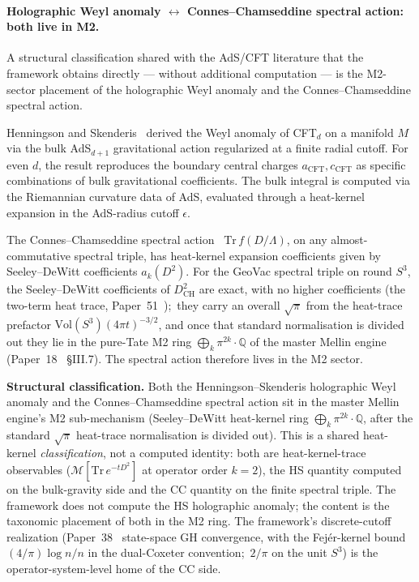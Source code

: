 \documentclass[11pt,a4paper]{article}
\theoremstyle{plain}
\theoremstyle{definition}
\newcommand{\sthree}{S^{3}}
\newcommand{\Q}{\mathbb{Q}}
\newcommand{\DCH}{D_{\mathrm{CH}}}
\begin{document}
\paragraph{Holographic Weyl anomaly $\leftrightarrow$ Connes--Chamseddine spectral action: both live in M2.}
A structural classification shared with the AdS/CFT literature that the framework
obtains directly --- without additional computation --- is the M2-sector
placement of the holographic Weyl anomaly and the
Connes--Chamseddine spectral action.

Henningson and Skenderis~\cite{henningson_skenderis1998} derived the Weyl
anomaly of CFT$_{d}$ on a manifold $M$ via the bulk AdS$_{d+1}$
gravitational action regularized at a finite radial cutoff. For even
$d$, the result reproduces the boundary central charges
$a_{\text{CFT}}, c_{\text{CFT}}$ as specific combinations of bulk
gravitational coefficients. The bulk integral is computed via the
Riemannian curvature data of AdS, evaluated through a heat-kernel
expansion in the AdS-radius cutoff $\epsilon$.

The Connes--Chamseddine spectral action~\cite{chamseddine_connes1997}
$\mathrm{Tr}\,f(D/\Lambda)$, on any almost-commutative spectral triple,
has heat-kernel expansion coefficients given by Seeley--DeWitt
coefficients $a_{k}(D^{2})$. For the GeoVac spectral triple on round
$\sthree$, the Seeley--DeWitt coefficients of $\DCH^{2}$ are exact,
with no higher coefficients (the two-term heat trace,
Paper~51~\cite{paper51});\ they carry an
overall $\sqrt{\pi}$ from the heat-trace prefactor
$\mathrm{Vol}(\sthree)(4\pi t)^{-3/2}$, and once that standard
normalisation is divided out they lie in the pure-Tate M2 ring
$\bigoplus_{k}\pi^{2k}\cdot\Q$ of the master Mellin engine
(Paper~18~\cite{paper18} \S III.7). The spectral action
therefore lives in the M2 sector.

\textbf{Structural classification.} Both the Henningson--Skenderis
holographic Weyl anomaly and the Connes--Chamseddine spectral action
sit in the master Mellin engine's M2 sub-mechanism (Seeley--DeWitt
heat-kernel ring $\bigoplus_{k}\pi^{2k}\cdot\Q$, after the standard
$\sqrt{\pi}$ heat-trace normalisation is divided out). This is a
shared heat-kernel \emph{classification}, not a computed identity: both
are heat-kernel-trace observables ($\mathcal{M}[\mathrm{Tr}\,e^{-tD^{2}}]$
at operator order $k = 2$), the HS quantity computed on the bulk-gravity
side and the CC quantity on the finite spectral triple. The framework
does not compute the HS holographic anomaly; the content is the
taxonomic placement of both in the M2 ring. The framework's
discrete-cutoff realization (Paper~38~\cite{paper38} state-space GH
convergence, with the Fej\'er-kernel bound $(4/\pi)\log n/n$ in the
dual-Coxeter convention;\ $2/\pi$ on the unit $\sthree$) is the
operator-system-level home of the
CC side.
\end{document}
